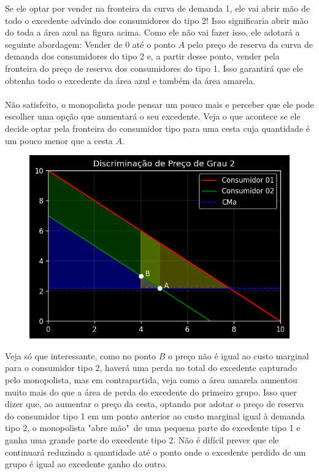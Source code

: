 \documentclass[a4paper,11pt,oneside]{book}
\theoremstyle{definition}
\theoremstyle{break}
\begin{document}
Se ele optar por vender na fronteira da curva de demanda 1, ele vai abrir mão de todo o excedente advindo dos consumidores do tipo 2! Isso significaria abrir mão do toda a área azul na figura acima. Como ele não vai fazer isso, ele adotará a seguinte abordagem: Vender de $0$ até o ponto $A$ pelo preço de reserva da curva de demanda dos consumidores do tipo 2 e, a partir desse ponto, vender pela fronteira do preço de reserva dos consumidores do tipo 1. Isso garantirá que ele obtenha todo o excedente da área azul e também da área amarela.
\\~\\
Não satisfeito, o monopolista pode pensar um pouco mais e perceber que ele pode escolher uma opção que aumentará o seu excedente. Veja o que acontece se ele decide optar pela fronteira do consumidor tipo para uma cesta cuja quantidade é um pouco menor que a cesta $A$.

\begin{figure}[H]
\centering
\includegraphics[scale=0.8]{cap26_3-discriminacao_grau2_2.png}
\end{figure}

Veja só que interessante, como no ponto $B$ o preço não é igual ao custo marginal para o consumidor tipo 2, haverá uma perda no total do excedente capturado pelo monopolista, mas em contrapartida, veja como a área amarela aumentou muito mais do que a área de perda do excedente do primeiro grupo. Isso quer dizer que, ao aumentar o preço da cesta, optando por adotar o preço de reserva do consumidor tipo 1 em um ponto anterior ao custo marginal igual à demanda tipo 2, o monopolista "abre mão"\ de uma pequena parte do excedente tipo 1 e ganha uma grande parte do excedente tipo 2. Não é difícil prever que ele continuará reduzindo a quantidade até o ponto onde o excedente perdido de um grupo é igual ao excedente ganho do outro.
\end{document}
